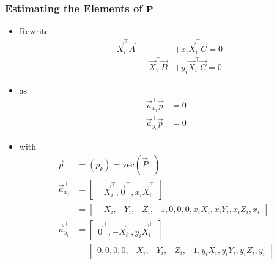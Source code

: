 \begin{frame}
  \frametitle{Estimating the Elements of $\boldsymbol{\mathbf{P}}$}
  \begin{itemize}
    \item Rewrite
    \begin{equation*}
      \begin{matrix}
        -\vec{X}_{i}^{\top}\vec{A}& &+x_{i}\vec{X}_{i}^{\top}\vec{C} = 0 \\
        &-\vec{X}_{i}^{\top}\vec{B} &+y_{i}\vec{X}_{i}^{\top}\vec{C} = 0
      \end{matrix}  
    \end{equation*}
      
    \item as
    \begin{align*}
        \vec{a}_{x_i}^{\top} \vec{p} &= 0 \\
        \vec{a}_{y_i}^{\top} \vec{p} &= 0
    \end{align*}

     \item with
    \begin{align*}
        \vec{p} &= (p_k) = \text{vec}(\vec{P}^{\top}) \\
        \vec{a}_{x_i}^{\top} &= \begin{bmatrix}-\vec{X}_i^{\top}, \vec{0}^{\top}, x_i \vec{X}_i^{\top}\end{bmatrix} \\
        &= \begin{bmatrix}-X_i, -Y_i, -Z_i, -1, 0, 0, 0, x_i X_i, x_i Y_i, x_i Z_i, x_i\end{bmatrix} \\
        \vec{a}_{y_i}^{\top} &= \begin{bmatrix}\vec{0}^{\top}, -\vec{X}_i^{\top}, y_i \vec{X}_i^{\top}\end{bmatrix} \\
        &= \begin{bmatrix}0, 0, 0, 0, -X_i, -Y_i, -Z_i, -1, y_i X_i, y_i Y_i, y_i Z_i, y_i\end{bmatrix}
    \end{align*}
  \end{itemize}
\end{frame}

